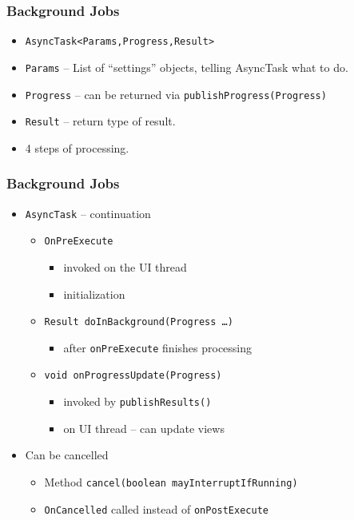 \documentclass[10pt,xcolor=pdflatex]{beamer}
\begin{document}
\begin{frame}[fragile]\frametitle{Background Jobs}
\begin{itemize}
	\item \verb;AsyncTask<Params,Progress,Result>;
	\item \texttt{Params} -- List of “settings” objects, telling AsyncTask what to do.
	\item \texttt{Progress} -- can be returned via \texttt{publishProgress(Progress)}
	\item \texttt{Result} -- return type of result.
    \item 4 steps of processing.
\end{itemize}
\end{frame}


\begin{frame}[fragile]\frametitle{Background Jobs}
\begin{itemize}
	\item \texttt{AsyncTask} -- continuation
	  \begin{itemize}
		\item \texttt{OnPreExecute}
          \begin{itemize}
            \item invoked on the UI thread
            \item initialization
          \end{itemize}
    	\item \texttt{Result doInBackground(Progress \ldots)}
          \begin{itemize}
            \item after \texttt{onPreExecute} finishes processing
          \end{itemize}
    	\item \texttt{void onProgressUpdate(Progress)}
          \begin{itemize}
            \item invoked by \texttt{publishResults()}
	        \item on UI thread -- can update views
          \end{itemize}
      \end{itemize}
	\item Can be cancelled
      \begin{itemize}
    	\item Method \texttt{cancel(boolean mayInterruptIfRunning)}
        \item \texttt{OnCancelled} called instead of \texttt{onPostExecute}
      \end{itemize}
\end{itemize}
\end{frame}
\end{document}
